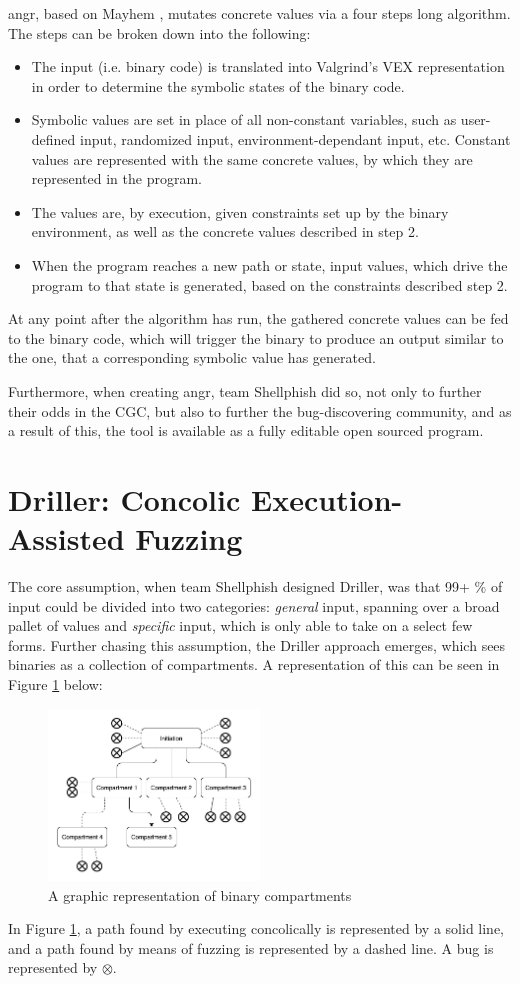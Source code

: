 \documentclass[a4paper]{article}
\newcommand{\tit}[1]{\textit{#1}}
\begin{document}
angr, based on Mayhem \cite{Mayhem}, mutates concrete values via a four steps long algorithm. The steps can be broken down into the following:
\begin{itemize}
	\item[1] The input (i.e. binary code) is translated into Valgrind's VEX \cite{VEX} representation in order to determine the symbolic states of the binary code.
	\item[2] Symbolic values are set in place of all non-constant variables, such as user-defined input, randomized input, environment-dependant input, etc. Constant values are represented with the same concrete values, by which they are represented in the program.
	\item[3] The values are, by execution, given constraints set up by the binary environment, as well as the concrete values described in step 2.
	\item[4] When the program reaches a new path or state, input values, which drive the program to that state is generated, based on the constraints described step 2.
\end{itemize}
At any point after the algorithm has run, the gathered concrete values can be fed to the binary code, which will trigger the binary to produce an output similar to the one, that a corresponding symbolic value has generated.

Furthermore, when creating angr, team Shellphish did so, not only to further their odds in the CGC, but also to further the bug-discovering community, and as a result of this, the tool is available as a fully editable open sourced program.
\section{Driller: Concolic Execution-Assisted Fuzzing}
The core assumption, when team Shellphish designed Driller, was that 99+ \% of input could be divided into two categories: \tit{general} input, spanning over a broad pallet of values and \tit{specific} input, which is only able to take on a select few forms. Further chasing this assumption, the Driller approach emerges, which sees binaries as a collection of compartments. A representation of this can be seen in Figure \ref{Compartments} below:
\begin{figure}[H]
	\centering
	\includegraphics[width=0.5\textwidth]{Compartments}
	\caption{A graphic representation of binary compartments}
	\label{Compartments}
\end{figure}
\noindent
In Figure \ref{Compartments}, a path found by executing concolically is represented by a solid line, and a path found by means of fuzzing is represented by a dashed line. A bug is represented by $\otimes$. 
\end{document}
